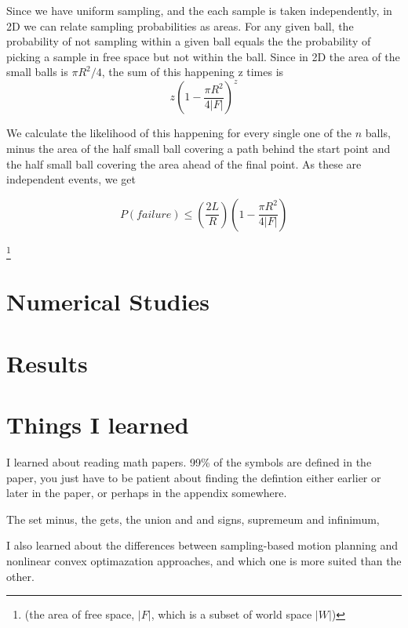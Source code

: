 \documentclass[a4paper]{article}
\begin{document}
Since we have uniform sampling, and the each sample is taken independently, in
2D we can relate sampling probabilities as areas.  For any given ball, the
probability of not sampling within a given ball equals the the probability of
picking a sample in free space but not within the ball. Since in 2D the area of the small balls is $\pi R^2 / 4$, the sum of this happening z times is 
\begin{equation}
    z \left(1 - \frac{\pi R^2}{4|F|}\right) ^z
\end {equation}

We calculate the likelihood of this happening for every single one of the $n$
    balls, minus the area of the half small ball covering a path behind the start
    point and the half small ball covering the area ahead of the final point. As these are
    independent events, we get

\begin{equation}
    P(failure) \leq \left(\frac{2L}{R}\right) \left(1 - \frac{\pi R^2}{4|F|}\right)
\end {equation}

\footnote{(the area of free space, $|F|$, which is a subset of world space
$|W|$)}

\section{Numerical Studies}

\section{Results}


\section{Things I learned}

I learned about reading math papers. 99\% of the symbols are defined in the
paper, you just have to be patient about finding the defintion either earlier or later in
the paper, or perhaps in the appendix somewhere.

The set minus, the gets, the union and and signs, supremeum and infinimum, 


I also learned about the differences between sampling-based motion planning and
nonlinear convex optimazation approaches, and which one is more suited than the
other.
\end{document}
